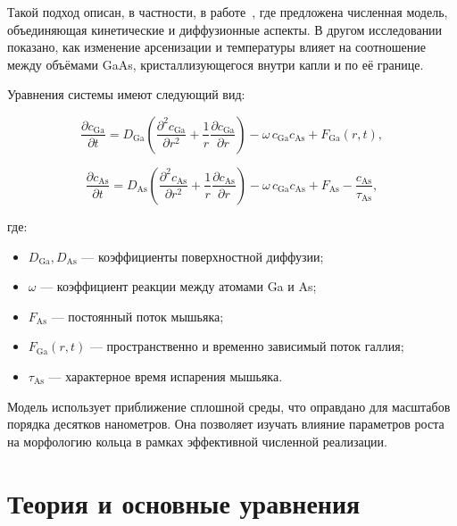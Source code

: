 \documentclass[14pt,oneside]{extarticle}
\begin{document}
Такой подход описан, в частности, в работе~\cite{reyes2013_1}, где предложена численная модель, объединяющая кинетические и диффузионные аспекты. В другом исследовании~\cite{bietti2020} показано, как изменение арсенизации и температуры влияет на соотношение между объёмами GaAs, кристаллизующегося внутри капли и по её границе.

Уравнения системы имеют следующий вид:

\begin{equation}
\frac{\partial c_{\text{Ga}}}{\partial t} = D_{\text{Ga}} \left( \frac{\partial^2 c_{\text{Ga}}}{\partial r^2} + \frac{1}{r} \frac{\partial c_{\text{Ga}}}{\partial r} \right)
- \omega \, c_{\text{Ga}} c_{\text{As}} + F_{\text{Ga}}(r,t),
\label{eq:ga_diff}
\end{equation}

\begin{equation}
\frac{\partial c_{\text{As}}}{\partial t} = D_{\text{As}} \left( \frac{\partial^2 c_{\text{As}}}{\partial r^2} + \frac{1}{r} \frac{\partial c_{\text{As}}}{\partial r} \right)
- \omega \, c_{\text{Ga}} c_{\text{As}} + F_{\text{As}} - \frac{c_{\text{As}}}{\tau_{\text{As}}},
\label{eq:as_diff}
\end{equation}

где:
\begin{itemize}
  \item $D_{\text{Ga}}, D_{\text{As}}$ — коэффициенты поверхностной диффузии;
  \item $\omega$ — коэффициент реакции между атомами Ga и As;
  \item $F_{\text{As}}$ — постоянный поток мышьяка;
  \item $F_{\text{Ga}}(r,t)$ — пространственно и временно зависимый поток галлия;
  \item $\tau_{\text{As}}$ — характерное время испарения мышьяка.
\end{itemize}

Модель использует приближение сплошной среды, что оправдано для масштабов порядка десятков нанометров. Она позволяет изучать влияние параметров роста на морфологию кольца в рамках эффективной численной реализации.

\pagebreak
\section{Теория и основные уравнения}
\end{document}
